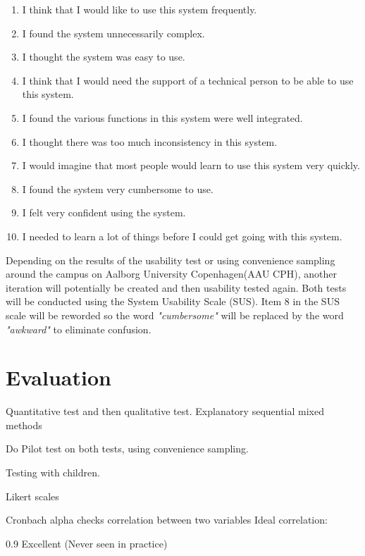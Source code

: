 \begin{enumerate} 
\item 	I think that I would like to use this system frequently.
\item 	I found the system unnecessarily complex.
\item 	I thought the system was easy to use.
\item 	I think that I would need the support of a technical person to be able to use this system.
\item 	I found the various functions in this system were well integrated.
\item 	I thought there was too much inconsistency in this system.
\item   I would imagine that most people would learn to use this system very quickly.
\item 	I found the system very cumbersome to use.
\item 	I felt very confident using the system.
\item 	I needed to learn a lot of things before I could get going with this system.
\end{enumerate} 
\par
 
  Depending on the results of the usability test or using convenience sampling around the campus on Aalborg University Copenhagen(AAU CPH), another iteration will potentially be created and then usability tested again. Both tests will be conducted using the System Usability Scale (SUS)\cite{susScale}. Item 8 in the SUS scale will be reworded so the word \textit{"cumbersome"} will be replaced by the word \textit{"awkward"} to eliminate confusion\cite{susScale}.
	
\section{Evaluation}
Quantitative test and then qualitative test.
Explanatory sequential mixed methods\cite[p.~21]{bjoernerBog}

Do Pilot test on both tests, using convenience sampling.

Testing with children\cite[p.~207]{bjoernerBog}.

Likert scales

Cronbach alpha checks correlation between two variables
Ideal correlation:

0.9 Excellent (Never seen in practice)

